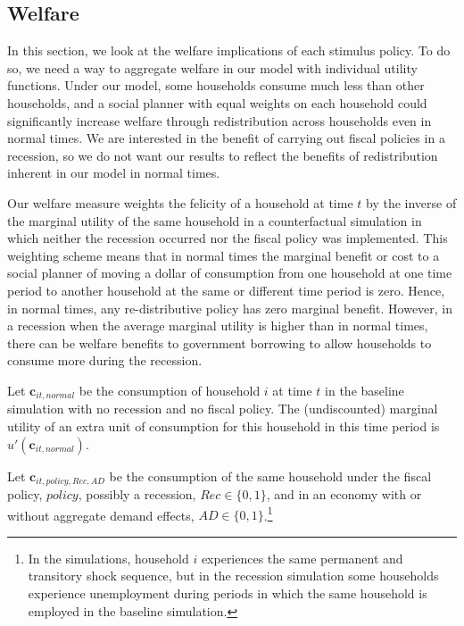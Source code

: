 \documentclass[\econtexRoot/HAFiscal]{subfiles}
\begin{document}
\hypertarget{welfare}{}\par\subsection{Welfare}
\notinsubfile{\label{sec:welfare}}

In this section, we look at the welfare implications of each stimulus policy. To do so, we need a way to aggregate welfare in our model with individual utility functions. Under our model, some households consume much less than other households, and a social planner with equal weights on each household could significantly increase welfare through redistribution across households even in normal times. We are interested in the benefit of carrying out fiscal policies in a recession, so we do not want our results to reflect the benefits of redistribution inherent in our model in normal times.

Our welfare measure weights the felicity of a household at time $t$ by the inverse of the marginal utility of the same household in a counterfactual simulation in which neither the recession occurred nor the fiscal policy was implemented. This weighting scheme means that in normal times the marginal benefit or cost to a social planner of moving a dollar of consumption from one household at one time period to another household at the same or different time period is zero. Hence, in normal times, any re-distributive policy has zero marginal benefit. However, in a recession when the average marginal utility is higher than in normal times, there can be welfare benefits to government borrowing to allow households to consume more during the recession.

Let $\mathbf{c}_{it,\textit{normal}}$ be the consumption of household $i$ at time $t$ in the baseline simulation with no recession and no fiscal policy. The (undiscounted) marginal utility of an extra unit of consumption for this household in this time period is $ u'(\mathbf{c}_{it,\textit{normal}})$.

Let $\mathbf{c}_{it,\textit{policy},Rec,AD}$ be the consumption of the same household under the fiscal policy, $\textit{policy}$, possibly a recession, $Rec \in \{0,1\}$, and in an economy with or without aggregate demand effects, $AD \in \{0,1\}$.\footnote{In the simulations, household $i$ experiences the same permanent and transitory shock sequence, but in the recession simulation some households experience unemployment during periods in which the same household is employed in the baseline simulation.}
\end{document}
